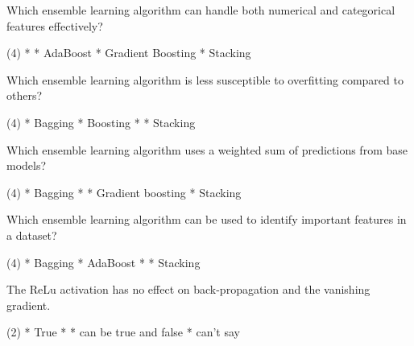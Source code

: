 \documentclass[10pt]{extarticle}
\begin{document}
\begin{exercise}
    Which ensemble learning algorithm can handle both numerical and categorical features effectively?
    \begin{choice} (4)
        * 
        * AdaBoost
        * Gradient Boosting
        * Stacking
    \end{choice}
\end{exercise}
\begin{solution}
\end{solution}

\begin{exercise}
    Which ensemble learning algorithm is less susceptible to overfitting compared to others?
    \begin{choice} (4)
        * Bagging
        * Boosting
        * 
        * Stacking
    \end{choice}
\end{exercise}
\begin{solution}
\end{solution}

\begin{exercise}
    Which ensemble learning algorithm uses a weighted sum of predictions from base models?
    \begin{choice} (4)
        * Bagging
        * 
        * Gradient boosting
        * Stacking
    \end{choice}
\end{exercise}
\begin{solution}
\end{solution}

\begin{exercise}
    Which ensemble learning algorithm can be used to identify important features in a dataset?
    \begin{choice} (4)
        * Bagging
        * AdaBoost
        * 
        * Stacking
    \end{choice}
\end{exercise}
\begin{solution}
\end{solution}

\begin{exercise}
    The ReLu activation has no effect on back-propagation and the vanishing gradient.
    \begin{choice} (2)
        * True
        * 
        * can be true and false
        * can't say
    \end{choice}
\end{exercise}
\begin{solution}
\end{solution}
\end{document}
